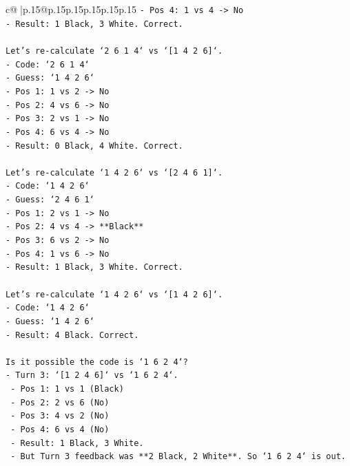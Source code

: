 \documentclass{article}
\begin{document}
{\begin{supertabular}{c@{$\;$}|p{.15\linewidth}@{}p{.15\linewidth}p{.15\linewidth}p{.15\linewidth}p{.15\linewidth}p{.15\linewidth}}
{{{\texttt{{-} Pos 4: 1 vs 4 {-}> No} \\
\texttt{{-} Result: 1 Black, 3 White. Correct.} \\
\\ 
\texttt{Let's re{-}calculate `2 6 1 4` vs `{[}1 4 2 6{]}`.} \\
\texttt{{-} Code: `2 6 1 4`} \\
\texttt{{-} Guess: `1 4 2 6`} \\
\texttt{{-} Pos 1: 1 vs 2 {-}> No} \\
\texttt{{-} Pos 2: 4 vs 6 {-}> No} \\
\texttt{{-} Pos 3: 2 vs 1 {-}> No} \\
\texttt{{-} Pos 4: 6 vs 4 {-}> No} \\
\texttt{{-} Result: 0 Black, 4 White. Correct.} \\
\\ 
\texttt{Let's re{-}calculate `1 4 2 6` vs `{[}2 4 6 1{]}`.} \\
\texttt{{-} Code: `1 4 2 6`} \\
\texttt{{-} Guess: `2 4 6 1`} \\
\texttt{{-} Pos 1: 2 vs 1 {-}> No} \\
\texttt{{-} Pos 2: 4 vs 4 {-}> **Black**} \\
\texttt{{-} Pos 3: 6 vs 2 {-}> No} \\
\texttt{{-} Pos 4: 1 vs 6 {-}> No} \\
\texttt{{-} Result: 1 Black, 3 White. Correct.} \\
\\ 
\texttt{Let's re{-}calculate `1 4 2 6` vs `{[}1 4 2 6{]}`.} \\
\texttt{{-} Code: `1 4 2 6`} \\
\texttt{{-} Guess: `1 4 2 6`} \\
\texttt{{-} Result: 4 Black. Correct.} \\
\\ 
\texttt{Is it possible the code is `1 6 2 4`?} \\
\texttt{{-} Turn 3: `{[}1 2 4 6{]}` vs `1 6 2 4`.} \\
\texttt{  {-} Pos 1: 1 vs 1 (Black)} \\
\texttt{  {-} Pos 2: 2 vs 6 (No)} \\
\texttt{  {-} Pos 3: 4 vs 2 (No)} \\
\texttt{  {-} Pos 4: 6 vs 4 (No)} \\
\texttt{  {-} Result: 1 Black, 3 White.} \\
\texttt{  {-} But Turn 3 feedback was **2 Black, 2 White**. So `1 6 2 4` is out.} \\
}}}
\end{supertabular}}
\end{document}
